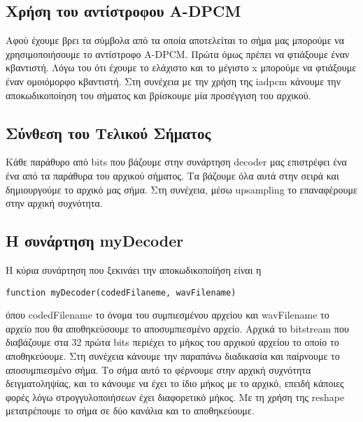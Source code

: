 \subsection{Χρήση του αντίστροφου A-DPCM}
\par Αφού έχουμε βρει τα σύμβολα από τα οποία αποτελείται το σήμα μας μπορούμε να
χρησιμοποιήσουμε το αντίστροφο A-DPCM. Πρώτα όμως πρέπει να φτιάξουμε έναν κβαντιστή.
Λόγω του ότι έχουμε το ελάχιστο και το μέγιστο x μπορούμε να φτιάξουμε έναν ομοιόμορφο
κβαντιστή. Στη συνέχεια με την χρήση της iadpcm κάνουμε την αποκωδικοποίηση του σήματος
και βρίσκουμε μία προσέγγιση του αρχικού.

\subsection{Σύνθεση του Τελικού Σήματος}
\par Κάθε παράθυρο από bits που βάζουμε στην συνάρτηση decoder μας επιστρέφει ένα
ένα από τα παράθυρα του αρχικού σήματος. Τα βάζουμε όλα αυτά στην σειρά και δημιουργούμε
το αρχικό μας σήμα. Στη συνέχεια, μέσω upsampling το επαναφέρουμε στην αρχική συχνότητα.

\subsection{Η συνάρτηση myDecoder}
\par Η κύρια συνάρτηση που ξεκινάει την αποκωδικοποίήση είναι η
\begin{lstlisting}[style=MyMatlab]
 function myDecoder(codedFilaneme, wavFilename)
\end{lstlisting}
όπου codedFilename το όνομα του συμπιεσμένου αρχείου και wavFilename το αρχείο που θα
αποθηκεύσουμε το αποσυμπιεσμένο αρχείο. Αρχικά το bitstream που διαβάζουμε στα 32 πρώτα
bits περιέχει το μήκος του αρχικού αρχείου το οποίο το αποθηκεύουμε. Στη συνέχεια κάνουμε
την παραπάνω διαδικασία και παίρνουμε το αποσυμπιεσμένο σήμα. Το σήμα αυτό το
φέρνουμε στην αρχική συχνότητα δειγματοληψίας, και το κάνουμε να έχει το ίδιο μήκος
με το αρχικό, επειδή κάποιες φορές λόγω στρογγυλοποιήσεων έχει διαφορετικό μήκος.
Με τη χρήση της reshape μετατρέπουμε το σήμα σε δύο κανάλια και το αποθηκεύουμε.

